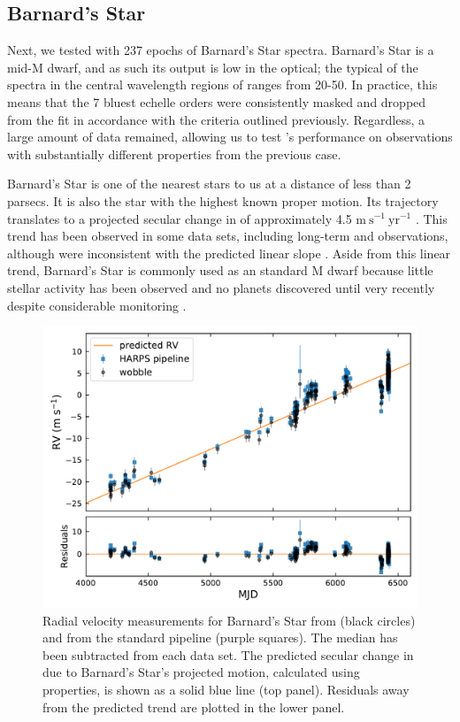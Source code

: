 \documentclass[modern]{aastex62}
\newcommand{\Mdwarf}{Barnard's Star\xspace} %
\begin{document}
\subsection{\Mdwarf}
\label{s:Mdwarf}

Next, we tested \wobble with 237 epochs of \Mdwarf spectra. 
\Mdwarf is a mid-M dwarf, and as such its output is low in the optical; the typical \SNR of the spectra in the central wavelength regions of \HARPS ranges from 20-50. 
In practice, this means that the 7 bluest echelle orders were consistently masked and dropped from the fit in accordance with the \SNR criteria outlined previously. 
Regardless, a large amount of data remained, allowing us to test \wobble's performance on observations with substantially different properties from the previous case.

\Mdwarf is one of the nearest stars to us at a distance of less than 2 parsecs. 
It is also the star with the highest known proper motion. 
Its trajectory translates to a projected secular change in \RV of approximately 4.5 $\mathrm{m}~\mathrm{s}^{-1}~\mathrm{yr}^{-1}$ \citep{Kurster2003}. 
This trend has been observed in some data sets, including long-term \HARPS and  observations, although  \RVs were inconsistent with the predicted linear slope \citep{Kurster2003, Bonfils2013, Choi2013, Montet2014}. 
Aside from this linear trend, \Mdwarf is commonly used as an \RV standard M dwarf because little stellar activity has been observed and no planets discovered until very recently despite considerable \RV monitoring \citep{Ribas2018}. 

\begin{figure}
\centering
\includegraphics[width=5in]{barnards_rvs}
\caption{Radial velocity measurements for \Mdwarf from \wobble (black circles) and from the standard \HARPS pipeline (purple squares). The median \RV has been subtracted from each data set. The predicted secular change in \RV due to \Mdwarf's projected motion, calculated using \gaia properties, is shown as a solid blue line (top panel). Residuals away from the predicted trend are plotted in the lower panel.}
\label{fig:barnards_rvs}
\end{figure}
\end{document}

